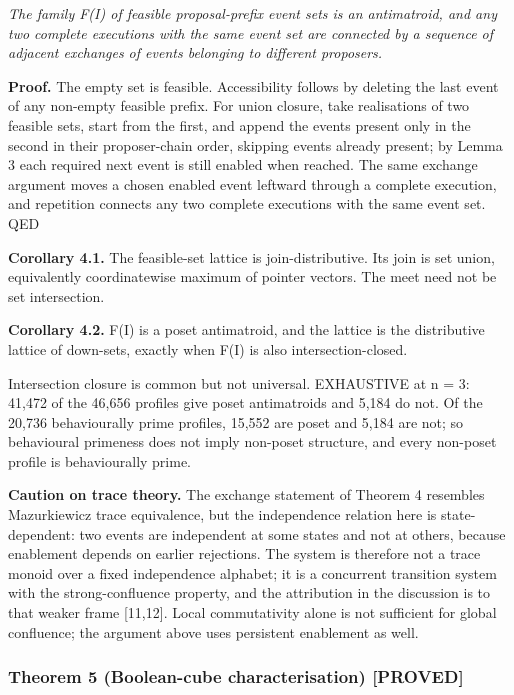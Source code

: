 \documentclass[
  11pt,
]{article}
\begin{document}
\emph{The family F(I) of feasible proposal-prefix event sets is an
antimatroid, and any two complete executions with the same event set are
connected by a sequence of adjacent exchanges of events belonging to
different proposers.}

\textbf{Proof.} The empty set is feasible. Accessibility follows by
deleting the last event of any non-empty feasible prefix. For union
closure, take realisations of two feasible sets, start from the first,
and append the events present only in the second in their proposer-chain
order, skipping events already present; by Lemma 3 each required next
event is still enabled when reached. The same exchange argument moves a
chosen enabled event leftward through a complete execution, and
repetition connects any two complete executions with the same event set.
QED

\textbf{Corollary 4.1.} The feasible-set lattice is join-distributive.
Its join is set union, equivalently coordinatewise maximum of pointer
vectors. The meet need not be set intersection.

\textbf{Corollary 4.2.} F(I) is a poset antimatroid, and the lattice is
the distributive lattice of down-sets, exactly when F(I) is also
intersection-closed.

Intersection closure is common but not universal. EXHAUSTIVE at n = 3:
41,472 of the 46,656 profiles give poset antimatroids and 5,184 do not.
Of the 20,736 behaviourally prime profiles, 15,552 are poset and 5,184
are not; so behavioural primeness does not imply non-poset structure,
and every non-poset profile is behaviourally prime.

\textbf{Caution on trace theory.} The exchange statement of Theorem 4
resembles Mazurkiewicz trace equivalence, but the independence relation
here is state-dependent: two events are independent at some states and
not at others, because enablement depends on earlier rejections. The
system is therefore not a trace monoid over a fixed independence
alphabet; it is a concurrent transition system with the
strong-confluence property, and the attribution in the discussion is to
that weaker frame {[}11,12{]}. Local commutativity alone is not
sufficient for global confluence; the argument above uses persistent
enablement as well.

\hypertarget{theorem-5-boolean-cube-characterisation-proved}{%
\subsubsection{Theorem 5 (Boolean-cube characterisation)
{[}PROVED{]}}\label{theorem-5-boolean-cube-characterisation-proved}}
\end{document}
